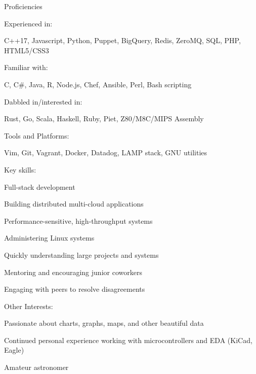 \documentclass[letterpaper,12pt]{article}
\begin{document}
\begin{paracol}{2}
\vspace{2em}
\begin{rsection}{Proficiencies}
  \begin{rpara}{Experienced in:}%
    \raggedright
    C++17, Javascript, Python, Puppet, BigQuery, Redis, ZeroMQ, SQL, PHP, HTML5/CSS3
  \end{rpara}
  \begin{rpara}{Familiar with:}%
    \raggedright
    C, C\#, Java, R, Node.js, Chef, Ansible, Perl, Bash scripting
  \end{rpara}
  \begin{rpara}{Dabbled in/interested in:}%
    \raggedright
    Rust, Go, Scala, Haskell, Ruby, Piet, Z80/M8C/MIPS Assembly
  \end{rpara}
  \begin{rpara}{Tools and Platforms:}%
    \raggedright
    Vim, Git, Vagrant, Docker, Datadog, LAMP stack, GNU utilities
  \end{rpara}
  \newpage
  \begin{rsubitems}[
    leftmargin=1.5em,
    itemindent=0em,
    labelwidth=1.5em
  ]{Key skills:}
    \item Full-stack development
    \item Building distributed multi-cloud applications
    \item Performance-sensitive, high-throughput systems
    \item Administering Linux systems
    \item Quickly understanding large projects and systems
    \item Mentoring and encouraging junior coworkers
    \item Engaging with peers to resolve disagreements
  \end{rsubitems}
  \begin{rsubitems}[
    leftmargin=1.5em,
    itemindent=0em,
    labelwidth=1.5em
  ]{Other Interests:}
    \item Passionate about charts, graphs, maps, and other beautiful data\\
    \item Continued personal experience working with microcontrollers and EDA (KiCad, Eagle)
    \item Amateur astronomer
  \end{rsubitems}
\end{rsection}


\end{paracol}
\end{document}
